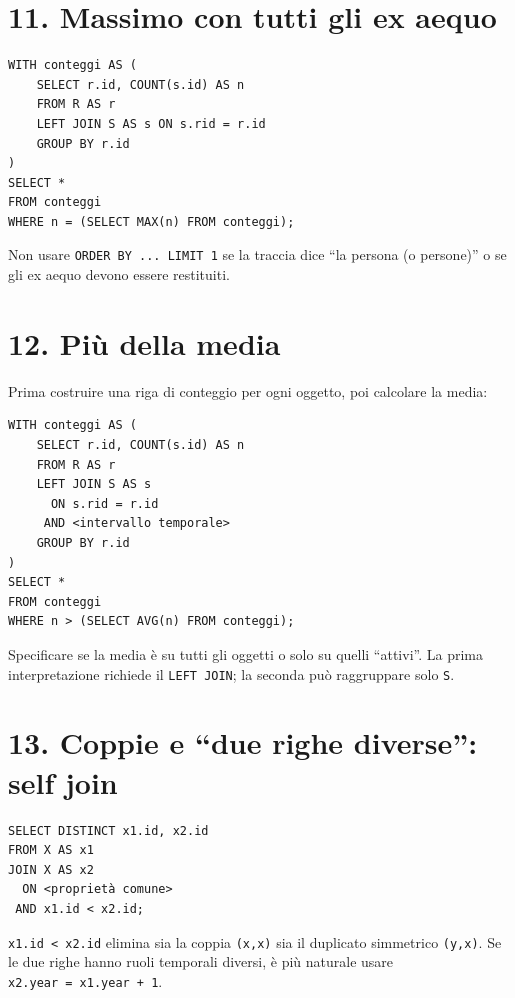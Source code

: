 \documentclass[
  10pt,
  a4paper,
]{article}
\begin{document}
\section{11. Massimo con tutti gli ex
aequo}\label{11-massimo-con-tutti-gli-ex-aequo}

\begin{verbatim}
WITH conteggi AS (
    SELECT r.id, COUNT(s.id) AS n
    FROM R AS r
    LEFT JOIN S AS s ON s.rid = r.id
    GROUP BY r.id
)
SELECT *
FROM conteggi
WHERE n = (SELECT MAX(n) FROM conteggi);
\end{verbatim}

Non usare \texttt{ORDER\ BY\ ...\ LIMIT\ 1} se la traccia dice ``la
persona (o persone)'' o se gli ex aequo devono essere restituiti.

\section{12. Più della media}\label{12-piuxf9-della-media}

Prima costruire una riga di conteggio per ogni oggetto, poi calcolare la
media:

\begin{verbatim}
WITH conteggi AS (
    SELECT r.id, COUNT(s.id) AS n
    FROM R AS r
    LEFT JOIN S AS s
      ON s.rid = r.id
     AND <intervallo temporale>
    GROUP BY r.id
)
SELECT *
FROM conteggi
WHERE n > (SELECT AVG(n) FROM conteggi);
\end{verbatim}

Specificare se la media è su tutti gli oggetti o solo su quelli
``attivi''. La prima interpretazione richiede il \texttt{LEFT\ JOIN}; la
seconda può raggruppare solo \texttt{S}.

\section{13. Coppie e ``due righe diverse'': self
join}\label{13-coppie-e-due-righe-diverse-self-join}

\begin{verbatim}
SELECT DISTINCT x1.id, x2.id
FROM X AS x1
JOIN X AS x2
  ON <proprietà comune>
 AND x1.id < x2.id;
\end{verbatim}

\texttt{x1.id\ \textless{}\ x2.id} elimina sia la coppia \texttt{(x,x)}
sia il duplicato simmetrico \texttt{(y,x)}. Se le due righe hanno ruoli
temporali diversi, è più naturale usare
\texttt{x2.year\ =\ x1.year\ +\ 1}.
\end{document}
